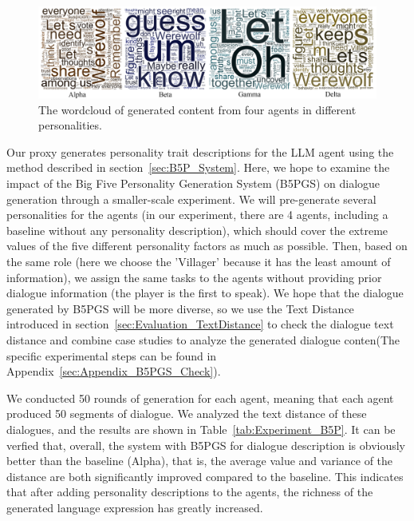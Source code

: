 \begin{figure}[ht]
  \centering
  \includegraphics[width=1.0\textwidth]{img/B5P_wordcloud.png}
  \caption{ The wordcloud of generated content from four agents in different personalities. }
\label{fig:Experiment_B5P_WordCloud}
    \vspace{-1em}
\end{figure}




Our proxy generates personality trait descriptions for the LLM agent using the method described in section~\ref{sec:B5P_System}. Here, we hope to examine the impact of the Big Five Personality Generation System (B5PGS) on dialogue generation through a smaller-scale experiment. We will pre-generate several personalities for the agents (in our experiment, there are 4 agents, including a baseline without any personality description), which should cover the extreme values of the five different personality factors as much as possible. Then, based on the same role (here we choose the 'Villager' because it has the least amount of information), we assign the same tasks to the agents without providing prior dialogue information (the player is the first to speak). We hope that the dialogue generated by B5PGS will be more diverse, so we use the Text Distance introduced in section~\ref{sec:Evaluation_TextDistance} to check the dialogue text distance and combine case studies to analyze the generated dialogue conten(The specific experimental steps can be found in Appendix~\ref{sec:Appendix_B5PGS_Check}).


We conducted 50 rounds of generation for each agent, meaning that each agent produced 50 segments of dialogue. We analyzed the text distance of these dialogues, and the results are shown in Table~\ref{tab:Experiment_B5P}. It can be verfied that, overall, the system with B5PGS for dialogue description is obviously better than the baseline (Alpha), that is, the average value and variance of the distance are both significantly improved compared to the baseline. This indicates that after adding personality descriptions to the agents, the richness of the generated language expression has greatly increased.

